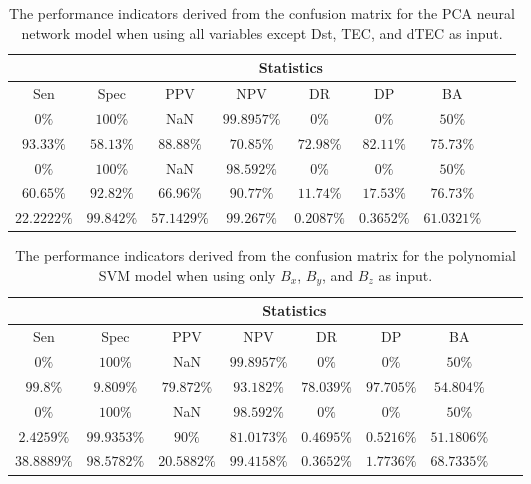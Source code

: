 \begin{table}[!ht]
	\centering
	\begin{tabular}{|c|c|c|c|c|c|c|c|c|}
		\hline
		 & \multicolumn{7}{c|}{Statistics} \\ \hline
		Sen & Spec & PPV & NPV & DR & DP & BA \\ \hline
		$0\%$ & $100\%$ & NaN & $99.8957\%$ & $0\%$ & $0\%$ & $50\%$ \\ \hline
		$93.33\%$ & $58.13\%$ & $88.88\%$ & $70.85\%$ & $72.98\%$ & $82.11\%$ & $75.73\%$ \\ \hline
		$0\%$ & $100\%$ & NaN & $98.592\%$ & $0\%$ & $0\%$ & $50\%$ \\ \hline
		$60.65\%$ & $92.82\%$ & $66.96\%$ & $90.77\%$ & $11.74\%$ & $17.53\%$ & $76.73\%$ \\ \hline
		$22.2222\%$ & $99.842\%$ & $57.1429\%$ & $99.267\%$ & $0.2087\%$ & $0.3652\%$ & $61.0321\%$ \\ \hline
	\end{tabular}
	\caption{The performance indicators derived from the confusion matrix for the PCA neural network model when using all variables except Dst, TEC, and dTEC as input.}
	\label{tab:cs:noTEC:pcaNNet}
\end{table}

\begin{table}[!ht]
	\centering
	\begin{tabular}{|c|c|c|c|c|c|c|c|c|}
		\hline
		 & \multicolumn{7}{c|}{Statistics} \\ \hline
		Sen & Spec & PPV & NPV & DR & DP & BA \\ \hline
		$0\%$ & $100\%$ & NaN & $99.8957\%$ & $0\%$ & $0\%$ & $50\%$ \\ \hline
		$99.8\%$ & $9.809\%$ & $79.872\%$ & $93.182\%$ & $78.039\%$ & $97.705\%$ & $54.804\%$ \\ \hline
		$0\%$ & $100\%$ & NaN & $98.592\%$ & $0\%$ & $0\%$ & $50\%$ \\ \hline
		$2.4259\%$ & $99.9353\%$ & $90\%$ & $81.0173\%$ & $0.4695\%$ & $0.5216\%$ & $51.1806\%$ \\ \hline
		$38.8889\%$ & $98.5782\%$ & $20.5882\%$ & $99.4158\%$ & $0.3652\%$ & $1.7736\%$ & $68.7335\%$ \\ \hline
	\end{tabular}
	\caption{The performance indicators derived from the confusion matrix for the polynomial SVM model when using only $B_{x}$, $B_{y}$, and $B_{z}$ as input.}
	\label{tab:cs:coord:svmPoly}
\end{table}

